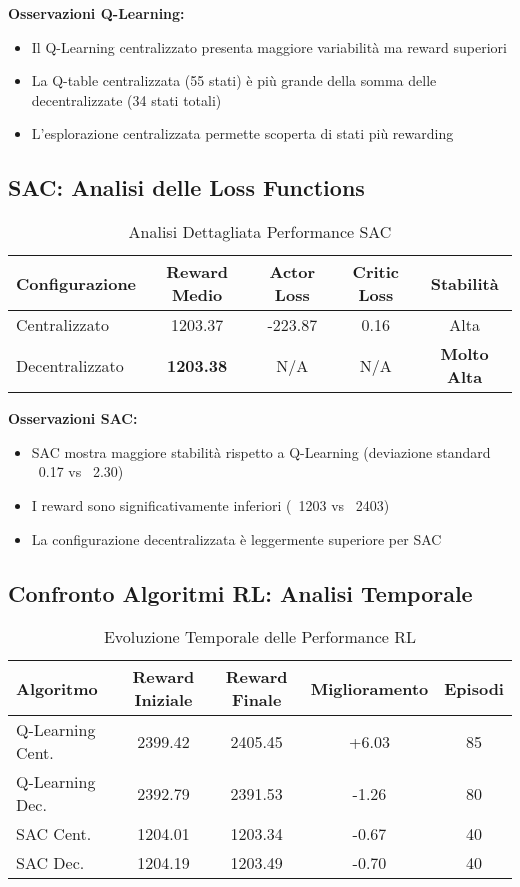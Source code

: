 \documentclass[12pt,a4paper,twoside]{report}
\begin{document}
\begin{appendices}
\textbf{Osservazioni Q-Learning:}
\begin{itemize}
    \item Il Q-Learning centralizzato presenta maggiore variabilità ma reward superiori
    \item La Q-table centralizzata (55 stati) è più grande della somma delle decentralizzate (34 stati totali)
    \item L'esplorazione centralizzata permette scoperta di stati più rewarding
\end{itemize}

\subsection{SAC: Analisi delle Loss Functions}

\begin{table}[H]
\centering
\caption{Analisi Dettagliata Performance SAC}
\label{tab:sac_detailed}
\begin{tabular}{|l|c|c|c|c|}
\hline
\textbf{Configurazione} & \textbf{Reward Medio} & \textbf{Actor Loss} & \textbf{Critic Loss} & \textbf{Stabilità} \\
\hline
Centralizzato & 1203.37 & -223.87 & 0.16 & Alta \\
Decentralizzato & \textbf{1203.38} & N/A & N/A & \textbf{Molto Alta} \\
\hline
\end{tabular}
\end{table}

\textbf{Osservazioni SAC:}
\begin{itemize}
    \item SAC mostra maggiore stabilità rispetto a Q-Learning (deviazione standard ~0.17 vs ~2.30)
    \item I reward sono significativamente inferiori (~1203 vs ~2403)
    \item La configurazione decentralizzata è leggermente superiore per SAC
\end{itemize}

\subsection{Confronto Algoritmi RL: Analisi Temporale}

\begin{table}[H]
\centering
\caption{Evoluzione Temporale delle Performance RL}
\label{tab:rl_temporal}
\begin{tabular}{|l|c|c|c|c|}
\hline
\textbf{Algoritmo} & \textbf{Reward Iniziale} & \textbf{Reward Finale} & \textbf{Miglioramento} & \textbf{Episodi} \\
\hline
Q-Learning Cent. & 2399.42 & 2405.45 & +6.03 & 85 \\
Q-Learning Dec. & 2392.79 & 2391.53 & -1.26 & 80 \\
SAC Cent. & 1204.01 & 1203.34 & -0.67 & 40 \\
SAC Dec. & 1204.19 & 1203.49 & -0.70 & 40 \\
\hline
\end{tabular}
\end{table}


\end{appendices}
\end{document}
